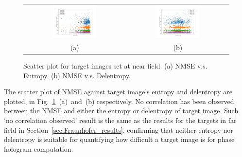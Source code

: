 	
	\begin{figure} [ht]
		\begin{center}
			\begin{tabular}{c c}
				\includegraphics[trim={80 50 90 70}, clip, width = 0.45\textwidth]{GS_Fresnel0.1_NMSE_VS_Entropy.png} &
				\includegraphics[trim={80 50 90 70}, clip, width = 0.45\textwidth]{GS_Fresnel0.1_NMSE_VS_Delentropy.png} \\
				(a) & (b)
			\end{tabular}
			\caption{\label{fig:GS_Fresnel0.1_NMSE_VS_Entropy_Delentropy} Scatter plot for target images set at near field. (a) NMSE v.s. Entropy. (b) NMSE v.s. Delentropy.}
		\end{center}
	\end{figure}
	
	The scatter plot of NMSE against target image's entropy and delentropy are plotted, in Fig.~\ref{fig:GS_Fresnel0.1_NMSE_VS_Entropy_Delentropy}~(a)~and~(b) respectively. No correlation has been observed between the NMSE and either the entropy or delentropy of target image. Such `no correlation observed' result is the same as the results for the targets in far field in Section~\ref{sec:Fraunhofer_results}, confirming that neither entropy nor delentropy is suitable for quantifying how difficult a target image is for phase hologram computation. 
	
